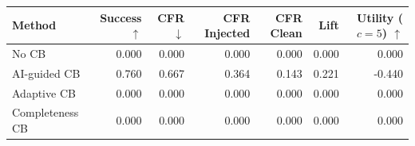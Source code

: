 \begin{tabular}{lrrrrrr}
\toprule
Method & Success $\uparrow$ & CFR $\downarrow$ & CFR Injected & CFR Clean & Lift & Utility ($c=5$) $\uparrow$ \\
\midrule
No CB & 0.000 & 0.000 & 0.000 & 0.000 & 0.000 & 0.000 \\
AI-guided CB & 0.760 & 0.667 & 0.364 & 0.143 & 0.221 & -0.440 \\
Adaptive CB & 0.000 & 0.000 & 0.000 & 0.000 & 0.000 & 0.000 \\
Completeness CB & 0.000 & 0.000 & 0.000 & 0.000 & 0.000 & 0.000 \\
\bottomrule
\end{tabular}
